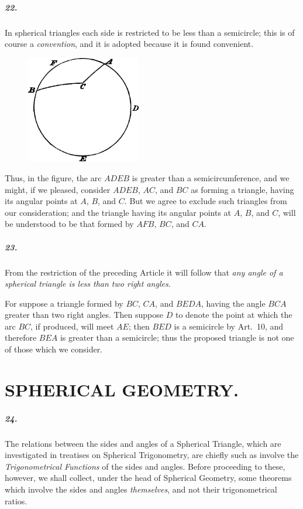 \documentclass{book}[2004/02/16]
\begin{document}
\begin{mainmatter}
\begin{spacing}{1.3}
\paragraph{22.} In spherical triangles each side is restricted to be less
than a semicircle; this is of course a \textit{convention}, and it is adopted
because it is found convenient.
\begin{figure}[htp]
\centering
\includegraphics[width=5.0cm]{images/019fc}
\end{figure}

Thus, in the figure, the arc $ADEB$ is greater than a semicircumference,
and we might, if we pleased, consider $ADEB$, $AC$,
and $BC$ as forming a triangle, having its angular points at $A$, $B$,
and $C$. But we agree to exclude such triangles from our consideration;
and the triangle having its angular points at $A$, $B$,
and $C$, will be understood to be that formed by $AFB$, $BC$, and $CA$.

\paragraph{23.} From the restriction of the preceding Article it will
follow that \textit{any angle of a spherical triangle is less than two right
angles}.

For suppose a triangle formed by $BC$, $CA$, and $BEDA$, having
the angle $BCA$ greater than two right angles. Then suppose $D$
to denote the point at which the arc $BC$, if produced, will meet
$AE$; then $BED$ is a semicircle by Art.\ 10, and therefore $BEA$
is greater than a semicircle; thus the proposed triangle is not one
of those which we consider.

\chapter[Spherical Geometry.]{SPHERICAL GEOMETRY.}

\paragraph{24.} The relations between the sides and angles of a Spherical
Triangle, which are investigated in treatises on Spherical Trigonometry,
are chiefly such as involve the \textit{Trigonometrical Functions}
of the sides and angles. Before proceeding to these, however, we
shall collect, under the head of Spherical Geometry, some theorems
which involve the sides and angles \textit{themselves}, and not their trigonometrical
ratios.


\end{spacing}
\end{mainmatter}
\end{document}
